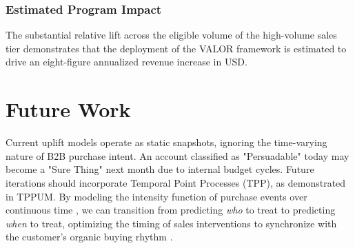 \documentclass[runningheads]{llncs}
\begin{document}
\begin{table}[h]
  \caption{Online A/B Experiment Results . The VALOR model demonstrates statistically significant gains in both Opportunity Rate and Per-Account Revenue compared to the Incumbent model.}
  \label{tab:ab_results}
\end{table}

\subsubsection{Estimated Program Impact}
The substantial relative lift across the eligible volume of the high-volume sales tier demonstrates that the deployment of the VALOR framework is estimated to drive an eight-figure annualized revenue increase in USD.

\section{Future Work}

Current uplift models operate as static snapshots, ignoring the time-varying nature of B2B purchase intent. An account classified as "Persuadable" today may become a "Sure Thing" next month due to internal budget cycles. Future iterations should incorporate Temporal Point Processes (TPP), as demonstrated in TPPUM\cite{tppum2025}. By modeling the intensity function of purchase events over continuous time \cite{Du2016}, we can transition from predicting \textit{who} to treat to predicting \textit{when} to treat, optimizing the timing of sales interventions to synchronize with the customer's organic buying rhythm \cite{Lim2018,Bica2019,Melnychuk2022}.
\end{document}
